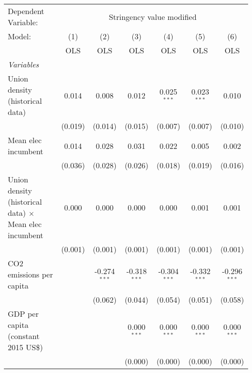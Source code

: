 
\begingroup
\centering
\begin{tabular}{lcccccc}
   \toprule
   Dependent Variable: & \multicolumn{6}{c}{Stringency value modified}\\
   Model:                                                        & (1)     & (2)            & (3)            & (4)            & (5)            & (6)\\  
                                                                 &  OLS    & OLS            & OLS            & OLS            & OLS            & OLS\\  
   \midrule
   \emph{Variables}\\
   Union density (historical data)                               & 0.014   & 0.008          & 0.012          & 0.025$^{***}$  & 0.023$^{***}$  & 0.010\\   
                                                                 & (0.019) & (0.014)        & (0.015)        & (0.007)        & (0.007)        & (0.010)\\   
   Mean elec incumbent                                           & 0.014   & 0.028          & 0.031          & 0.022          & 0.005          & 0.002\\   
                                                                 & (0.036) & (0.028)        & (0.026)        & (0.018)        & (0.019)        & (0.016)\\   
   Union density (historical data) $\times$ Mean elec incumbent  & 0.000   & 0.000          & 0.000          & 0.000          & 0.001          & 0.001\\   
                                                                 & (0.001) & (0.001)        & (0.001)        & (0.001)        & (0.001)        & (0.001)\\   
   CO2 emissions per capita                                      &         & -0.274$^{***}$ & -0.318$^{***}$ & -0.304$^{***}$ & -0.332$^{***}$ & -0.296$^{***}$\\   
                                                                 &         & (0.062)        & (0.044)        & (0.054)        & (0.051)        & (0.058)\\   
   GDP per capita (constant 2015 US\$)                           &         &                & 0.000$^{***}$  & 0.000$^{***}$  & 0.000$^{***}$  & 0.000$^{***}$\\   
                                                                 &         &                & (0.000)        & (0.000)        & (0.000)        & (0.000)\\   

\end{tabular}
